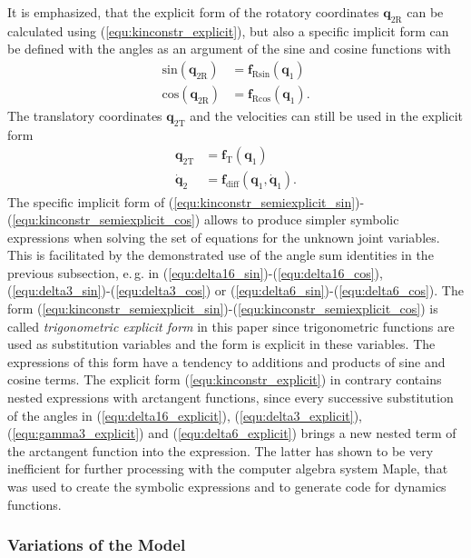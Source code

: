 \documentclass[letterpaper, 10 pt, conference]{ieeeconf}  %
\begin{document}
It is emphasized, that the explicit form of the rotatory coordinates $\bm{q}_{2\mathrm{R}}$ can be calculated using (\ref{equ:kinconstr_explicit}), but also a specific implicit form can be defined with the angles as an argument of the sine and cosine functions with
%
\begin{align}
\mathrm{sin}(\bm{q}_{2\mathrm{R}}) &= \bm{f}_{\mathrm{R}\mathrm{sin}}(\bm{q}_1) \label{equ:kinconstr_semiexplicit_sin} \\
\mathrm{cos}(\bm{q}_{2\mathrm{R}}) &= \bm{f}_{\mathrm{R}\mathrm{cos}}(\bm{q}_1). \label{equ:kinconstr_semiexplicit_cos}
\end{align}
%
The translatory coordinates $\bm{q}_{2\mathrm{T}}$ and the velocities can still be used in the explicit form
%
\begin{align}
\bm{q}_{2\mathrm{T}} &= \bm{f}_{\mathrm{T}}(\bm{q}_1)  \label{equ:kinconstr_semiexplicit_transl} \\
\dot{\bm{q}}_2 &= \bm{f}_\mathrm{diff}(\bm{q}_1,\dot{\bm{q}}_1). \label{equ:kinconstr_semiexplicit_diff}
\end{align}
%
The specific implicit form of (\ref{equ:kinconstr_semiexplicit_sin})-(\ref{equ:kinconstr_semiexplicit_cos}) allows to produce simpler symbolic expressions when solving the set of equations for the unknown joint variables. 
This is facilitated by the demonstrated use of the angle sum identities in the previous subsection, e.\,g. in (\ref{equ:delta16_sin})-(\ref{equ:delta16_cos}), (\ref{equ:delta3_sin})-(\ref{equ:delta3_cos}) or (\ref{equ:delta6_sin})-(\ref{equ:delta6_cos}).
The form  (\ref{equ:kinconstr_semiexplicit_sin})-(\ref{equ:kinconstr_semiexplicit_cos}) is called \emph{trigonometric explicit form} in this paper since trigonometric functions are used as substitution variables and the form is explicit in these variables.
The expressions of this form have a tendency to additions and products of sine and cosine terms.
The explicit form (\ref{equ:kinconstr_explicit}) in contrary contains nested expressions with arctangent functions, since every successive substitution of the angles in (\ref{equ:delta16_explicit}), (\ref{equ:delta3_explicit}), (\ref{equ:gamma3_explicit}) and (\ref{equ:delta6_explicit}) brings a new nested term of the arctangent function into the expression.
The latter has shown to be very inefficient for further processing with the computer algebra system Maple, that was used to create the symbolic expressions and to generate code for dynamics functions.

\subsubsection{Variations of the Model}
\end{document}
